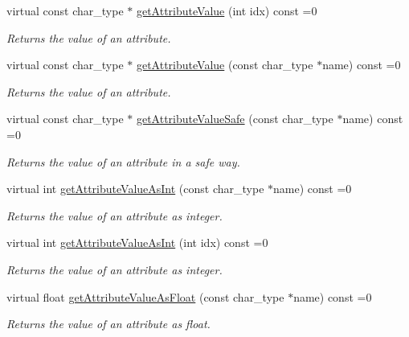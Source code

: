 \begin{DoxyCompactItemize}
virtual const char\+\_\+type $\ast$ \hyperlink{classirr_1_1io_1_1IIrrXMLReader_a41bd71a1b9d4a80cd1d0257dedb35325}{get\+Attribute\+Value} (int idx) const =0
\begin{DoxyCompactList}\small\item\em Returns the value of an attribute. \end{DoxyCompactList}\item 
virtual const char\+\_\+type $\ast$ \hyperlink{classirr_1_1io_1_1IIrrXMLReader_adaac9a49b396e7fc2d335335f36391a9}{get\+Attribute\+Value} (const char\+\_\+type $\ast$name) const =0
\begin{DoxyCompactList}\small\item\em Returns the value of an attribute. \end{DoxyCompactList}\item 
virtual const char\+\_\+type $\ast$ \hyperlink{classirr_1_1io_1_1IIrrXMLReader_a7674852b2e24b2710b90aab10ef1fc22}{get\+Attribute\+Value\+Safe} (const char\+\_\+type $\ast$name) const =0
\begin{DoxyCompactList}\small\item\em Returns the value of an attribute in a safe way. \end{DoxyCompactList}\item 
virtual int \hyperlink{classirr_1_1io_1_1IIrrXMLReader_ab37bef58865355a7dba0011a38e6c8e7}{get\+Attribute\+Value\+As\+Int} (const char\+\_\+type $\ast$name) const =0
\begin{DoxyCompactList}\small\item\em Returns the value of an attribute as integer. \end{DoxyCompactList}\item 
virtual int \hyperlink{classirr_1_1io_1_1IIrrXMLReader_a8f2d57c9f358b9683fb177f440661426}{get\+Attribute\+Value\+As\+Int} (int idx) const =0
\begin{DoxyCompactList}\small\item\em Returns the value of an attribute as integer. \end{DoxyCompactList}\item 
virtual float \hyperlink{classirr_1_1io_1_1IIrrXMLReader_a2b1032f213e9910827842f6057269235}{get\+Attribute\+Value\+As\+Float} (const char\+\_\+type $\ast$name) const =0
\begin{DoxyCompactList}\small\item\em Returns the value of an attribute as float. \end{DoxyCompactList}\item 

\end{DoxyCompactItemize}
